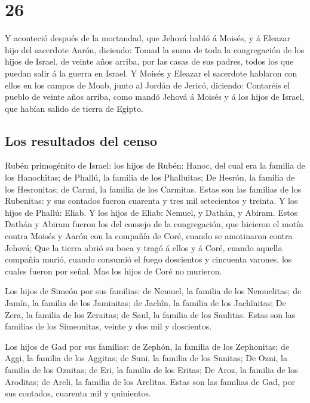 \hypertarget{section-04-26}{%
\section{26}\label{section-04-26}}

 Y aconteció después de la mortandad, que Jehová habló á
Moisés, y á Eleazar hijo del sacerdote Aarón, diciendo: 
Tomad la suma de toda la congregación de los hijos de Israel, de veinte
años arriba, por las casas de sus padres, todos los que puedan salir á
la guerra en Israel.  Y Moisés y Eleazar el sacerdote
hablaron con ellos en los campos de Moab, junto al Jordán de Jericó,
diciendo:  Contaréis el pueblo de veinte años arriba, como
mandó Jehová á Moisés y á los hijos de Israel, que habían salido de
tierra de Egipto.

\hypertarget{los-resultados-del-censo-1}{%
\subsection{Los resultados del censo}\label{los-resultados-del-censo-1}}

 Rubén primogénito de Israel: los hijos de Rubén: Hanoc,
del cual era la familia de los Hanochîtas; de Phallú, la familia de los
Phalluitas;  De Hesrón, la familia de los Hesronitas; de
Carmi, la familia de los Carmitas.  Estas son las familias
de los Rubenitas: y sus contados fueron cuarenta y tres mil setecientos
y treinta.  Y los hijos de Phallú: Eliab.  Y
los hijos de Eliab: Nemuel, y Dathán, y Abiram. Estos Dathán y Abiram
fueron los del consejo de la congregación, que hicieron el motín contra
Moisés y Aarón con la compañía de Coré, cuando se amotinaron contra
Jehová;  Que la tierra abrió su boca y tragó á ellos y á
Coré, cuando aquella compañía murió, cuando consumió el fuego doscientos
y cincuenta varones, los cuales fueron por señal.  Mas
los hijos de Coré no murieron.

 Los hijos de Simeón por sus familias: de Nemuel, la
familia de los Nemuelitas; de Jamín, la familia de los Jaminitas; de
Jachîn, la familia de los Jachînitas;  De Zera, la
familia de los Zeraitas; de Saul, la familia de los Saulitas.
 Estas son las familias de los Simeonitas, veinte y dos
mil y doscientos.

 Los hijos de Gad por sus familias: de Zephón, la familia
de los Zephonitas; de Aggi, la familia de los Aggitas; de Suni, la
familia de los Sunitas;  De Ozni, la familia de los
Oznitas; de Eri, la familia de los Eritas;  De Aroz, la
familia de los Aroditas; de Areli, la familia de los Arelitas.
 Estas son las familias de Gad, por sus contados,
cuarenta mil y quinientos.

